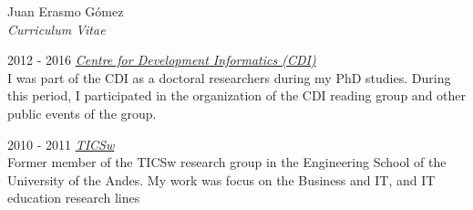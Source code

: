 \documentclass[10pt]{article}
\begin{document}
\begin{cv}{Juan Erasmo Gómez\\{\large \itshape Curriculum Vitae}}
\begin{cvlist}{}
  \item[2012 - 2016] \textit{\href{http://www.cdi.manchester.ac.uk/}{Centre for Development Informatics (CDI)}}\\
    {I was part of the CDI as a doctoral researchers during my PhD studies. During this period, I participated in the organization of the CDI reading group and other public events of the group.}

  \item[2010 - 2011] \textit{ \href{http://ticsw.uniandes.edu.co}{TICSw} }\\
      {Former member of the TICSw research group in the Engineering School of the University of the Andes. My work was focus on the Business and IT, and IT education research lines}


\end{cvlist}
\end{cv}
\end{document}
